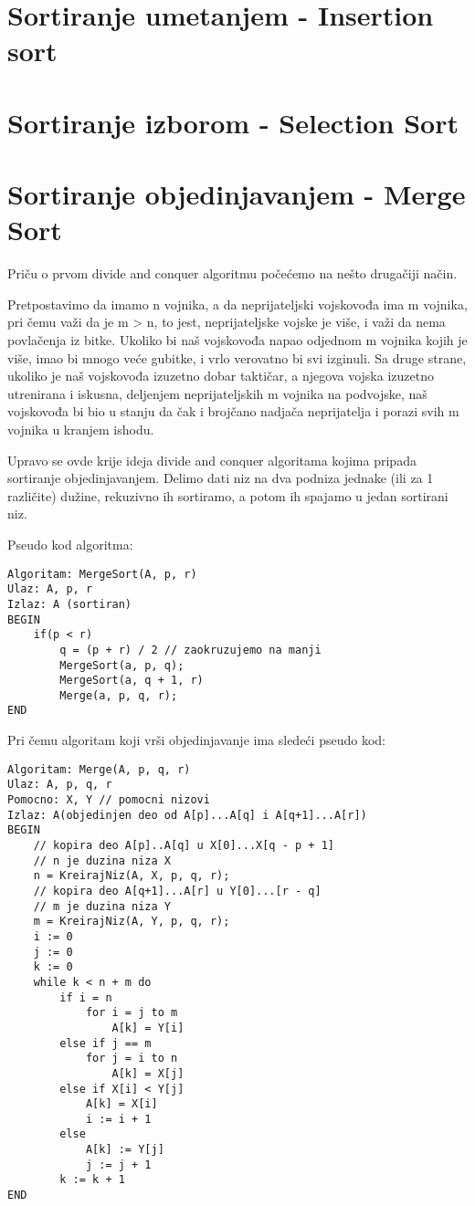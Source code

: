 \documentclass{memoir}
\begin{document}
\section{Sortiranje umetanjem - Insertion sort}

\section{Sortiranje izborom - Selection Sort}

\section{Sortiranje objedinjavanjem - Merge Sort}
Priču o prvom divide and conquer algoritmu počećemo na nešto drugačiji način.

Pretpostavimo da imamo n vojnika, a da neprijateljski vojskovođa ima m vojnika, pri čemu važi da je m > n, to jest, neprijateljske vojske je više, i važi da nema povlačenja iz bitke. 
Ukoliko bi naš vojskovođa napao odjednom m vojnika kojih je više, imao bi mnogo veće gubitke, i vrlo verovatno bi svi izginuli. Sa druge strane, ukoliko je naš vojskovođa izuzetno dobar taktičar, a njegova vojska
izuzetno utrenirana i iskusna, deljenjem neprijateljskih m vojnika na podvojske, naš vojskovođa bi bio u stanju da čak i brojčano nadjača neprijatelja i porazi svih m vojnika u kranjem ishodu.

Upravo se ovde krije ideja divide and conquer algoritama kojima pripada sortiranje objedinjavanjem. Delimo dati niz na dva podniza jednake (ili za 1 različite) dužine, rekuzivno ih sortiramo, a potom
ih spajamo u jedan sortirani niz. 

Pseudo kod algoritma:
\begin{lstlisting}
Algoritam: MergeSort(A, p, r)
Ulaz: A, p, r
Izlaz: A (sortiran)
BEGIN
	if(p < r)
		q = (p + r) / 2 // zaokruzujemo na manji
		MergeSort(a, p, q);
		MergeSort(a, q + 1, r)
		Merge(a, p, q, r);
END
\end{lstlisting}

Pri čemu algoritam koji vrši objedinjavanje ima sledeći pseudo kod:
\begin{lstlisting}
Algoritam: Merge(A, p, q, r)
Ulaz: A, p, q, r
Pomocno: X, Y // pomocni nizovi
Izlaz: A(objedinjen deo od A[p]...A[q] i A[q+1]...A[r])
BEGIN
	// kopira deo A[p]..A[q] u X[0]...X[q - p + 1]
	// n je duzina niza X
	n = KreirajNiz(A, X, p, q, r);  
	// kopira deo A[q+1]...A[r] u Y[0]...[r - q]
	// m je duzina niza Y
	m = KreirajNiz(A, Y, p, q, r);
	i := 0
	j := 0
	k := 0
	while k < n + m do
		if i = n
			for i = j to m
				A[k] = Y[i]
		else if j == m
			for j = i to n
				A[k] = X[j]
		else if X[i] < Y[j]
			A[k] = X[i]
			i := i + 1
		else 
			A[k] := Y[j]
			j := j + 1
		k := k + 1
END
\end{lstlisting}
\end{document}
